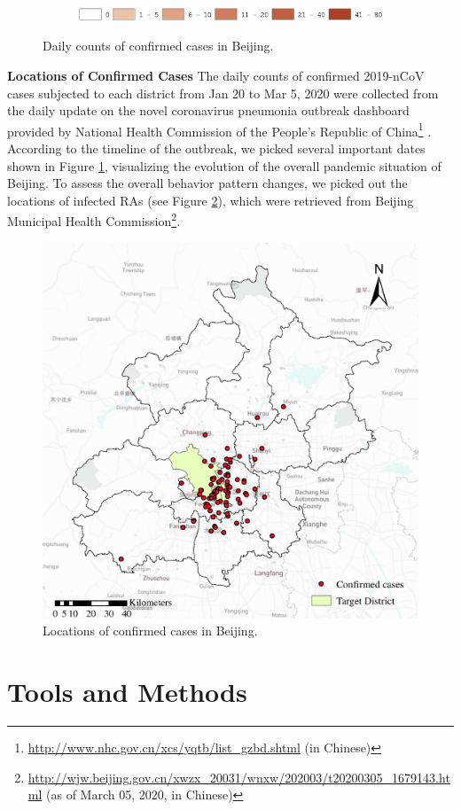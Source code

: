 \documentclass[preprints,ijgi,submit,moreauthors]{Definitions/mdpi}
\begin{document}
\begin{figure}[ht]
    \vspace{6pt}
    \begin{subfigure}{0.7\textwidth}
        \includegraphics[width=\textwidth]{Figures/Fig2legend.eps}
    \end{subfigure}
    \caption{Daily counts of confirmed cases in Beijing.}
    \label{fig:number_of_confirmed_cases}
\end{figure}

\textbf{Locations of Confirmed Cases}
The daily counts of confirmed 2019-nCoV cases subjected to each district from Jan 20 to Mar 5, 2020 were collected from the daily update on the novel coronavirus pneumonia outbreak dashboard provided by National Health Commission of the People's Republic of China\footnote{\url{http://www.nhc.gov.cn/xcs/yqtb/list_gzbd.shtml} (in Chinese)} .
According to the timeline \cite{li2020early} of the outbreak, we picked several important dates shown in Figure \ref{fig:number_of_confirmed_cases}, visualizing the evolution of the overall pandemic situation of Beijing.
To assess the overall behavior pattern changes, we picked out the locations of infected RAs (see Figure \ref{fig:locations_of_confirmed_cases}), which were retrieved from Beijing Municipal Health Commission\footnote{\url{http://wjw.beijing.gov.cn/xwzx_20031/wnxw/202003/t20200305_1679143.html} (as of March 05, 2020, in Chinese)}.  

\begin{figure}[ht]
    \centering
    \includegraphics[width=.5\textwidth]{Figures/Plot_location_confirmed_cases.eps}
    \caption{Locations of confirmed cases in Beijing.}
    \label{fig:locations_of_confirmed_cases}
\end{figure}

\section{Tools and Methods}
\end{document}
